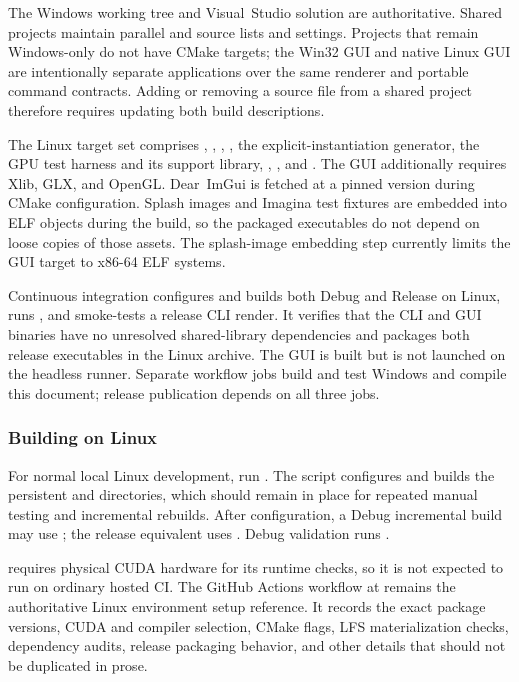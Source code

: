 The Windows working tree and Visual~Studio solution are authoritative. Shared
projects maintain parallel  and  source
lists and settings. Projects that remain Windows-only do not have CMake targets;
the Win32 GUI and native Linux GUI are intentionally separate applications over
the same renderer and portable command contracts. Adding or removing a source
file from a shared project therefore requires updating both build descriptions.

The Linux target set comprises ,
, ,
, the explicit-instantiation generator, the GPU test
harness and its support library, ,
, and . The GUI additionally
requires Xlib, GLX, and OpenGL. Dear~ImGui is fetched at a pinned version during
CMake configuration. Splash images and Imagina test fixtures are embedded into
ELF objects during the build, so the packaged executables do not depend on
loose copies of those assets. The splash-image embedding step currently limits
the GUI target to x86-64 ELF systems.

Continuous integration configures and builds both Debug and Release on Linux,
runs , and smoke-tests a release CLI render. It verifies
that the CLI and GUI binaries have no unresolved shared-library dependencies
and packages both release executables in the Linux archive. The GUI is built
but is not launched on the headless runner. Separate workflow jobs build and
test Windows and compile this document; release publication depends on all
three jobs.

\subsubsection{Building on Linux}
\label{subsec:building-linux}

For normal local Linux development, run . The script
configures and builds the persistent  and
 directories, which should remain in place for repeated
manual testing and incremental rebuilds. After configuration, a Debug
incremental build may use ;
the release equivalent uses . Debug validation runs
.

 requires physical CUDA hardware for its runtime
checks, so it is not expected to run on ordinary hosted CI. The GitHub Actions
workflow at  remains the authoritative Linux
environment setup reference. It records the exact package versions, CUDA and
compiler selection, CMake flags, LFS materialization checks, dependency audits,
release packaging behavior, and other details that should not be duplicated in
prose.

